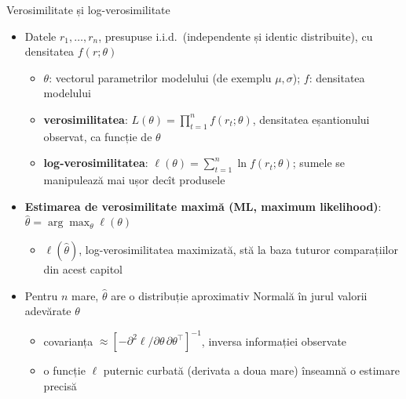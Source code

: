 \begin{frame}{Verosimilitate și log-verosimilitate}
\itemsize{\footnotesize}
\begin{itemize}
    \item Datele $r_1, \dots, r_n$, presupuse i.i.d.\ (independente și identic distribuite), cu densitatea $f(r; \theta)$
    \begin{itemize}
        \item $\theta$: vectorul parametrilor modelului (de exemplu $\mu, \sigma$); $f$: densitatea modelului
        \item \textbf{verosimilitatea}: $L(\theta) = \prod_{t=1}^n f(r_t; \theta)$, densitatea eșantionului observat, ca funcție de $\theta$
        \item \textbf{log-verosimilitatea}: $\ell(\theta) = \sum_{t=1}^n \ln f(r_t; \theta)$; sumele se manipulează mai ușor decît produsele
    \end{itemize}
    \item \textbf{Estimarea de verosimilitate maximă (ML, maximum likelihood)}: $\hat\theta = \arg\max_\theta \ell(\theta)$
    \begin{itemize}
        \item $\ell(\hat\theta)$, log-verosimilitatea maximizată, stă la baza tuturor comparațiilor din acest capitol
    \end{itemize}
    \item Pentru $n$ mare, $\hat\theta$ are o distribuție aproximativ Normală în jurul valorii adevărate $\theta$
    \begin{itemize}
        \item covarianța $\approx [-\partial^2\ell/\partial\theta\,\partial\theta^\top]^{-1}$, inversa informației observate
        \item o funcție $\ell$ puternic curbată (derivata a doua mare) înseamnă o estimare precisă
    \end{itemize}
\end{itemize}
\end{frame}

